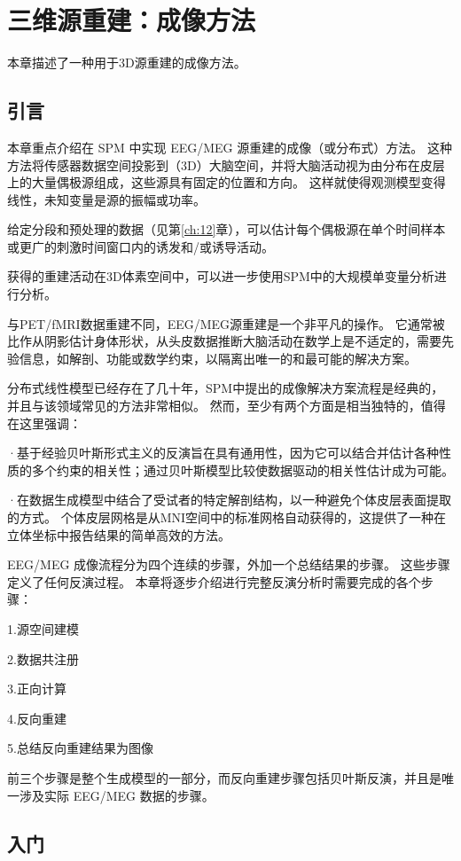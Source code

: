 \chapter{三维源重建：成像方法}
\label{ch:14}

本章描述了一种用于3D源重建的成像方法。


\section{引言}

本章重点介绍在 SPM 中实现 EEG/MEG 源重建的成像（或分布式）方法。
这种方法将传感器数据空间投影到（3D）大脑空间，并将大脑活动视为由分布在皮层上的大量偶极源组成，这些源具有固定的位置和方向。
这样就使得观测模型变得线性，未知变量是源的振幅或功率。

给定分段和预处理的数据（见第\ref{ch:12}章），可以估计每个偶极源在单个时间样本或更广的刺激时间窗口内的诱发和/或诱导活动。

获得的重建活动在3D体素空间中，可以进一步使用SPM中的大规模单变量分析进行分析。

与PET/fMRI数据重建不同，EEG/MEG源重建是一个非平凡的操作。
它通常被比作从阴影估计身体形状，从头皮数据推断大脑活动在数学上是不适定的，需要先验信息，如解剖、功能或数学约束，以隔离出唯一的和最可能的解决方案。

分布式线性模型已经存在了几十年，SPM中提出的成像解决方案流程是经典的，并且与该领域常见的方法非常相似。
然而，至少有两个方面是相当独特的，值得在这里强调：

·基于经验贝叶斯形式主义的反演旨在具有通用性，因为它可以结合并估计各种性质的多个约束的相关性；通过贝叶斯模型比较使数据驱动的相关性估计成为可能。

·在数据生成模型中结合了受试者的特定解剖结构，以一种避免个体皮层表面提取的方式。
个体皮层网格是从MNI空间中的标准网格自动获得的，这提供了一种在立体坐标中报告结果的简单高效的方法。

EEG/MEG 成像流程分为四个连续的步骤，外加一个总结结果的步骤。
这些步骤定义了任何反演过程。
本章将逐步介绍进行完整反演分析时需要完成的各个步骤：

1.源空间建模

2.数据共注册

3.正向计算

4.反向重建

5.总结反向重建结果为图像

前三个步骤是整个生成模型的一部分，而反向重建步骤包括贝叶斯反演，并且是唯一涉及实际 EEG/MEG 数据的步骤。


\section{入门}

